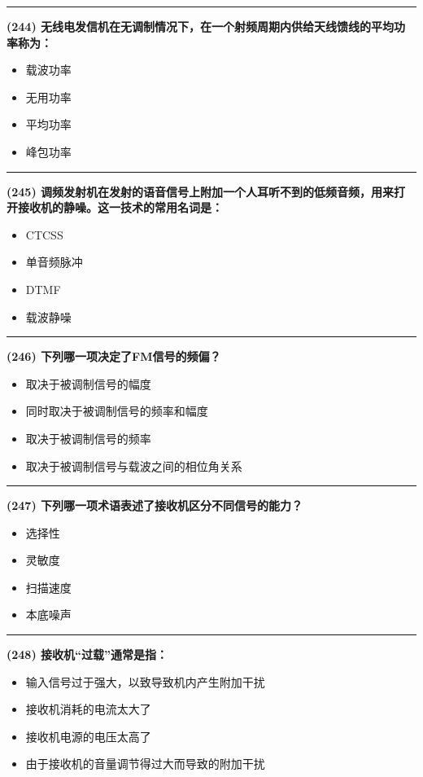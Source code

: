 \documentclass[twocolumn]{ctexart}  %
\begin{document}
\noindent\rule{0.5\textwidth}{1pt}
\heiti \textbf{(244) 无线电发信机在无调制情况下，在一个射频周期内供给天线馈线的平均功率称为：} \songti {\color{gray} [LK1044] }
\begin{itemize}
	\item  载波功率
	\item  无用功率
	\item  平均功率
	\item  峰包功率
\end{itemize}


\noindent\rule{0.5\textwidth}{1pt}
\heiti \textbf{(245) 调频发射机在发射的语音信号上附加一个人耳听不到的低频音频，用来打开接收机的静噪。这一技术的常用名词是：} \songti {\color{gray} [LK1099] }
\begin{itemize}
	\item  CTCSS
	\item  单音频脉冲
	\item  DTMF
	\item  载波静噪
\end{itemize}


\noindent\rule{0.5\textwidth}{1pt}
\heiti \textbf{(246) 下列哪一项决定了FM信号的频偏？} \songti {\color{gray} [LK1100] }
\begin{itemize}
	\item  取决于被调制信号的幅度
	\item  同时取决于被调制信号的频率和幅度
	\item  取决于被调制信号的频率
	\item  取决于被调制信号与载波之间的相位角关系
\end{itemize}


\noindent\rule{0.5\textwidth}{1pt}
\heiti \textbf{(247) 下列哪一项术语表述了接收机区分不同信号的能力？} \songti {\color{gray} [LK1177] }
\begin{itemize}
	\item  选择性
	\item  灵敏度
	\item  扫描速度
	\item  本底噪声
\end{itemize}


\noindent\rule{0.5\textwidth}{1pt}
\heiti \textbf{(248) 接收机“过载”通常是指：} \songti {\color{gray} [LK1180] }
\begin{itemize}
	\item  输入信号过于强大，以致导致机内产生附加干扰
	\item  接收机消耗的电流太大了
	\item  接收机电源的电压太高了
	\item  由于接收机的音量调节得过大而导致的附加干扰
\end{itemize}
\end{document}
